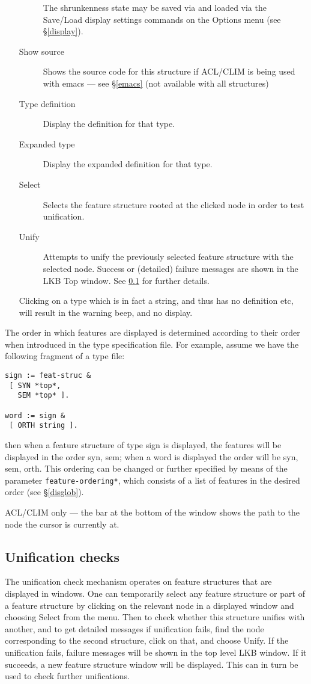 \documentclass[12pt]{report}
\newcommand{\lkbparam}[1]{{\tt #1}}
\newcommand{\lkbmenucommand}{{\bf}}
\begin{document}
\begin{enumerate}
\begin{description}
The shrunkenness state may be saved via and loaded via the
{\lkbmenucommand Save/Load display settings} commands on the {\lkbmenucommand Options} menu
(see \S\ref{display}).
\item [Show source] Shows the source code for this structure 
if ACL/CLIM is being used with emacs --- see \S\ref{emacs} (not available
with all structures)
\item[Type definition] 
Display the definition for that type.
\item[Expanded type]
Display the expanded definition for that type.
\item[Select]  Selects the
feature structure rooted at the clicked node in order to test unification.
\item[Unify] Attempts to unify the previously selected feature structure
with the selected node.  Success or (detailed) failure messages
are shown in the LKB Top window.  See \ref{unifcheck} for further
details.
\end{description}
Clicking on a type which is in fact a string, and thus has no
definition etc, will result in the warning beep, and no display.
\end{enumerate}

The order in which features are displayed is determined according to
their order when introduced in the type specification file.  For
example, assume we have the following fragment of a type file:
\begin{verbatim}
sign := feat-struc &
 [ SYN *top*, 
   SEM *top* ].

word := sign &
 [ ORTH string ].
\end{verbatim}
then when a feature structure of type {\type sign} is displayed, the
features will be displayed in the order {\feature syn}, {\feature sem}; when a {\type
word} is displayed the order will be {\feature syn}, {\feature sem}, {\feature orth}.
This ordering can be changed or further specified by
means of the parameter \lkbparam{*feature-ordering*}, which consists of
a list of features in the desired order (see \S\ref{disglob}).

ACL/CLIM only --- the bar at the bottom of the window shows the
path to the node the cursor is currently at.

\subsection{Unification checks}
\label{unifcheck}

The unification check mechanism operates on feature
structures that are displayed in windows.  One can
temporarily select any feature structure or part of a feature structure
by clicking on the relevant node in a displayed window and choosing
{\lkbmenucommand Select} from the menu.  Then to check whether this structure
unifies with another, and to get detailed messages if unification fails,
find the node corresponding to the second
structure, click on that, and choose {\lkbmenucommand Unify}.
If the unification fails, failure messages will be shown in the
top level LKB window.  If it succeeds, a new feature structure
window will be displayed.  This can in turn be used to check further
unifications.
\end{document}
